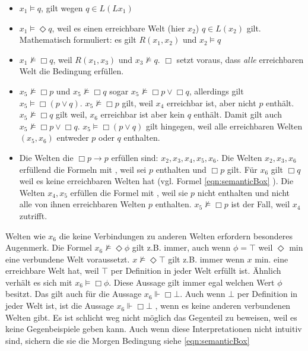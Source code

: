 \curr
\begin{itemize}
	\item $x_1 \vDash q$, gilt wegen $q \in L(Lx_1)$
	\item $x_1 \vDash \Diamond q$, weil es einen erreichbare Welt (hier $x_2$) $q \in L(x_2)$ gilt. Mathematisch formuliert: es gilt $R(x_1, x_2)$ und $x_2 \vDash q$
	\item $x_1 \nvDash \Box q$, weil $R(x_1,x_3)$ und $x_3 \nvDash q$. $\Box$ setzt voraus, dass \emph{alle} erreichbaren Welt die Bedingung erfüllen.
	\item $x_5 \nvDash \Box p$ und $x_5 \nvDash \Box q$ sogar $x_5 \nvDash \Box p \vee \Box q$, allerdings gilt $x_5 \vDash \Box (p \vee q)$. $x_5 \nvDash \Box p$ gilt, weil $x_4$ erreichbar ist, aber nicht $p$ enthält. $x_5 \nvDash \Box q$ gilt weil, $x_6$ erreichbar ist aber kein $q$ enthält. Damit gilt auch $x_5 \nvDash \Box p \vee \Box q$. $x_5 \vDash \Box (p \vee q)$ gilt hingegen, weil alle erreichbaren Welten $(x_5, x_6)$ entweder $p$ oder $q$ enthalten.
	\item Die Welten die $\Box p \rightarrow p$ erfüllen sind: $x_2, x_3, x_4, x_5, x_6$.
	Die Welten $x_2, x_3, x_6$ erfüllend die Formeln mit \true, weil sei $p$ enthalten und $\Box p$ gilt. Für $x_6$ gilt $\Box q$ weil es keine erreichbaren Welten hat (vgl. Formel \eqref{eqn:semanticBox} ).
	Die Welten $x_4, x_5$ erfüllen die Formel mit \false, weil sie $p$ nicht enthalten und nicht alle von ihnen erreichbaren Welten $p$ enthalten. $x_5 \nvDash \Box p$ ist der Fall, weil $x_4$ zutrifft.
\end{itemize}
%
Welten wie $x_6$ die keine Verbindungen zu anderen Welten erfordern besonderes Augenmerk.
Die Formel $x_6 \nvDash \Diamond \phi$ gilt z.B. immer, auch wenn $\phi = \top$ weil $\Diamond$ min eine verbundene Welt voraussetzt.
$x \nvDash \Diamond \top$ gilt z.B. immer wenn $x$ min. eine erreichbare Welt hat, weil $\top$ per Definition in jeder Welt erfüllt ist.
Ähnlich verhält es sich mit $x_6 \vDash \Box \phi$. Diese Aussage gilt immer egal welchen Wert $\phi$ besitzt.
Das gilt auch für die Aussage $x_6 \Vdash \Box \bot$. 
Auch wenn $\bot$ per Definition in jeder Welt \false ist, ist die Aussage $x_6 \Vdash \Box \bot$ \true, wenn es keine anderen verbundenen Welten gibt.
Es ist schlicht weg nicht möglich das Gegenteil zu beweisen, weil es keine Gegenbeispiele geben kann.
Auch wenn diese Interpretationen nicht intuitiv sind, sichern die sie die Morgen Bedingung siehe \eqref{eqn:semanticBox}



